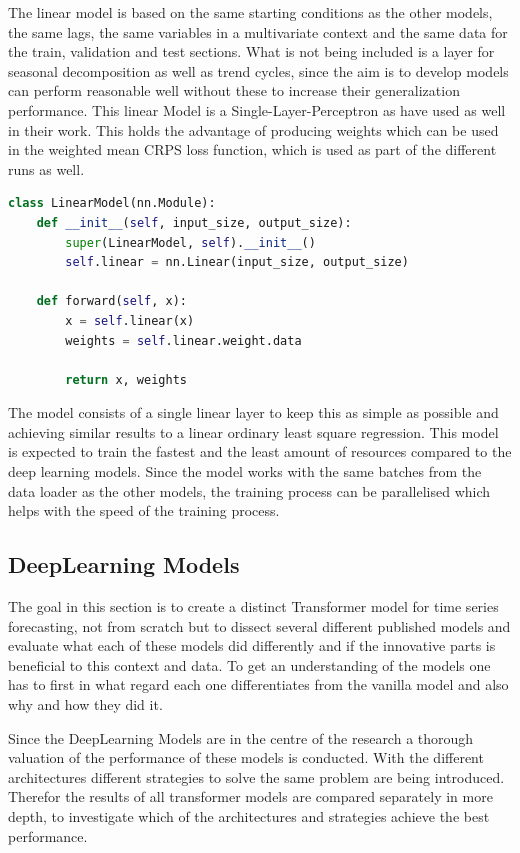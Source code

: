 \documentclass{article}
\begin{document}
The linear model is based on the same starting conditions as the other models, the same lags, the same variables in a multivariate context and the same data for the train, validation and test sections. What is not being included is a layer for seasonal decomposition as well as trend cycles, since the aim is to develop models can perform reasonable well without these to increase their generalization performance. This linear Model is a Single-Layer-Perceptron as \cite{transformers-effectiveness} have used as well in their work. This holds the advantage of producing weights which can be used in the weighted mean CRPS loss function, which is used as part of the different runs as well.
\begin{lstlisting}[language=Python, caption=Single-Layer-Perceptron]
class LinearModel(nn.Module):
    def __init__(self, input_size, output_size):
        super(LinearModel, self).__init__()
        self.linear = nn.Linear(input_size, output_size)

    def forward(self, x):
        x = self.linear(x)
        weights = self.linear.weight.data
        
        return x, weights
\end{lstlisting}\label{code:LinearModel}
The model consists of a single linear layer to keep this as simple as possible and achieving similar results to a linear ordinary least square regression. This model is expected to train the fastest and the least amount of resources compared to the deep learning models. Since the model works with the same batches from the data loader as the other models, the training process can be parallelised which helps with the speed of the training process. 

\subsection{DeepLearning Models}

The goal in this section is to create a distinct Transformer model for time series forecasting, not from scratch but to dissect several different published models and evaluate what each of these models did differently and if the innovative parts is beneficial to this context and data. To get an understanding of the models one has to first in what regard each one differentiates from the vanilla model and also why and how they did it. \par 
Since the DeepLearning Models are in the centre of the research a thorough valuation of the performance of these models is conducted. With the different architectures different strategies to solve the same problem are being introduced. Therefor the results of all transformer models are compared separately in more depth, to investigate which of the architectures and strategies achieve the best performance.
\end{document}
